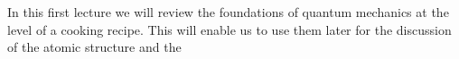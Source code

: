 In this first lecture we will review the foundations of quantum mechanics at the level of a cooking recipe. This will enable us to use them later for the discussion of the atomic structure and the 